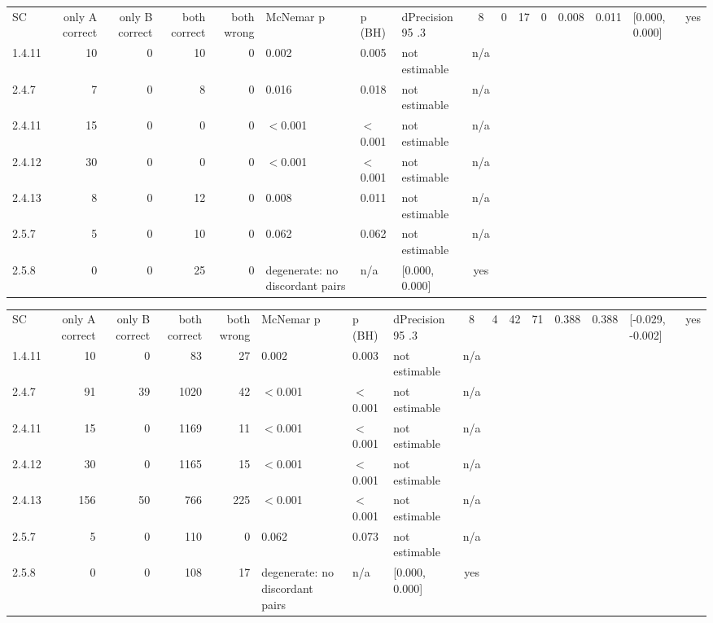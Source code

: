 \begin{tabular}{lrrrrlllc}
\hline
SC & only A correct & only B correct & both correct & both wrong & McNemar p & p (BH) & dPrecision 95%
.3 & 8 & 0 & 17 & 0 & 0.008 & 0.011 & [0.000, 0.000] & yes \\
1.4.11 & 10 & 0 & 10 & 0 & 0.002 & 0.005 & not estimable & n/a \\
2.4.7 & 7 & 0 & 8 & 0 & 0.016 & 0.018 & not estimable & n/a \\
2.4.11 & 15 & 0 & 0 & 0 & $<$0.001 & $<$0.001 & not estimable & n/a \\
2.4.12 & 30 & 0 & 0 & 0 & $<$0.001 & $<$0.001 & not estimable & n/a \\
2.4.13 & 8 & 0 & 12 & 0 & 0.008 & 0.011 & not estimable & n/a \\
2.5.7 & 5 & 0 & 10 & 0 & 0.062 & 0.062 & not estimable & n/a \\
2.5.8 & 0 & 0 & 25 & 0 & degenerate: no discordant pairs & n/a & [0.000, 0.000] & yes \\
\hline
\end{tabular}

\begin{tabular}{lrrrrlllc}
\hline
SC & only A correct & only B correct & both correct & both wrong & McNemar p & p (BH) & dPrecision 95%
.3 & 8 & 4 & 42 & 71 & 0.388 & 0.388 & [-0.029, -0.002] & yes \\
1.4.11 & 10 & 0 & 83 & 27 & 0.002 & 0.003 & not estimable & n/a \\
2.4.7 & 91 & 39 & 1020 & 42 & $<$0.001 & $<$0.001 & not estimable & n/a \\
2.4.11 & 15 & 0 & 1169 & 11 & $<$0.001 & $<$0.001 & not estimable & n/a \\
2.4.12 & 30 & 0 & 1165 & 15 & $<$0.001 & $<$0.001 & not estimable & n/a \\
2.4.13 & 156 & 50 & 766 & 225 & $<$0.001 & $<$0.001 & not estimable & n/a \\
2.5.7 & 5 & 0 & 110 & 0 & 0.062 & 0.073 & not estimable & n/a \\
2.5.8 & 0 & 0 & 108 & 17 & degenerate: no discordant pairs & n/a & [0.000, 0.000] & yes \\
\hline
\end{tabular}

